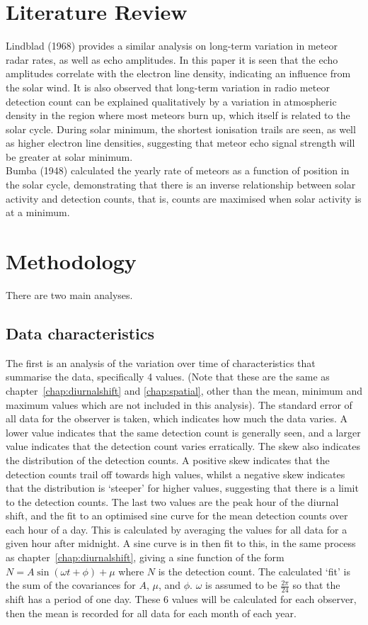 \section{Literature Review}
\label{sec:temp:litrev}
Lindblad (1968) \cite{lindblad} provides a similar analysis on long-term variation in meteor radar rates, as well as echo amplitudes. In this paper it is seen that the echo amplitudes correlate with the electron line density, indicating an influence from the solar wind. It is also observed that long-term variation in radio meteor detection count can be explained qualitatively by a variation in atmospheric density in the region where most meteors burn up, which itself is related to the solar cycle. During solar minimum, the shortest ionisation trails are seen, as well as higher electron line densities, suggesting that meteor echo signal strength will be greater at solar minimum.\\
Bumba (1948) \cite{bumba} calculated the yearly rate of meteors as a function of position in the solar cycle, demonstrating that there is an inverse relationship between solar activity and detection counts, that is, counts are maximised when solar activity is at a minimum.
\section{Methodology}
There are two main analyses. 
\subsection{Data characteristics}
The first is an analysis of the variation over time of characteristics that summarise the data, specifically 4 values. (Note that these are the same as chapter~\ref{chap:diurnalshift} and \ref{chap:spatial}, other than the mean, minimum and maximum values which are not included in this analysis). The standard error of all data for the observer is taken, which indicates how much the data varies. A lower value indicates that the same detection count is generally seen, and a larger value indicates that the detection count varies erratically. The skew also indicates the distribution of the detection counts. A positive skew indicates that the detection counts trail off towards high values, whilst a negative skew indicates that the distribution is `steeper' for higher values, suggesting that there is a limit to the detection counts. The last two values are the peak hour of the diurnal shift, and the fit to an optimised sine curve for the mean detection counts over each hour of a day. This is calculated by averaging the values for all data for a given hour after midnight. A sine curve is in then fit to this, in the same process as chapter~\ref{chap:diurnalshift}, giving a sine function of the form $N = A \sin \left( \omega t + \phi \right) + \mu$ where $N$ is the detection count. The calculated `fit' is the sum of the covariances for $A$, $\mu$, and $\phi$. $\omega$ is assumed to be $\frac{2\pi}{24}$ so that the shift has a period of one day. These 6 values will be calculated for each observer, then the mean is recorded for all data for each month of each year.
